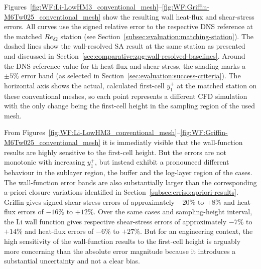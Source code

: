 Figures~\ref{fig:WF:Li-LowHM3_conventional_mesh}--\ref{fig:WF:Griffin-M6Tw025_conventional_mesh} show the resulting wall heat-flux and shear-stress errors. All curves use the signed relative error to the respective DNS reference at the matched \(Re_{\delta2}\) station (see Section~\ref{subsec:evaluation:matching-station}). The dashed lines show the wall-resolved SA result at the same station as presented and discussed in Section~\ref{sec:comparative:zpg:wall-resolved-baselines}. Around the DNS reference value for th heat-flux and shear stress, the shading marks a $\pm5\%$ error band (as selected in Section~\ref{sec:evaluation:success-criteria}). The horizontal axis shows the actual, calculated first-cell $y_1^+$ at the matched station on these conventional meshes, so each point represents a different CFD simulation with the only change being the first-cell height in the sampling region of the used mesh.
\par\medskip

From Figures~\ref{fig:WF:Li-LowHM3_conventional_mesh}--\ref{fig:WF:Griffin-M6Tw025_conventional_mesh}  it is immediatly visible that the wall-function results are highly sensitive to the first-cell height. But the errors are not monotonic with increasing $y_1^+$, but instead exhibit a pronounced different behaviour in the sublayer region, the buffer and the log-layer region of the cases. The wall-function error bands are also substantially larger than the corresponding a-priori closure variations identified in Section~\ref{subsec:erriso:apriori-results}. Griffin gives signed shear-stress errors of approximately \(-20\%\) to \(+8\%\) and heat-flux errors of \(-16\%\) to \(+12\%\). Over the same cases and sampling-height interval, the Li wall function gives respective shear-stress errors of approximately \(-7\%\) to \(+14\%\) and heat-flux errors of \(-6\%\) to \(+27\%\). But for an engineering context, the high sensitivity of the wall-function results to the first-cell height is arguably more concerning than the absolute error magnitude because it introduces a substantial uncertainty and not a clear bias.
\par\medskip

